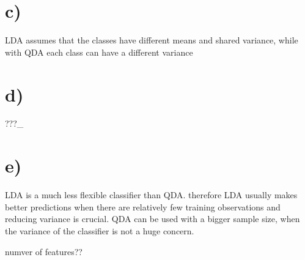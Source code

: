 \documentclass[12pt]{article}
\begin{document}
\section*{c)}
LDA assumes that the classes have different means and shared variance,
while with QDA each class can have a different variance

\section*{d)}
???_

\section*{e)}
LDA is a much less flexible classifier than QDA.
therefore LDA usually makes better predictions when there are
relatively few training observations and reducing variance is crucial.
QDA can be used with a bigger sample size, when the variance of the
classifier is not a huge concern.

numver of features??
\end{document}

